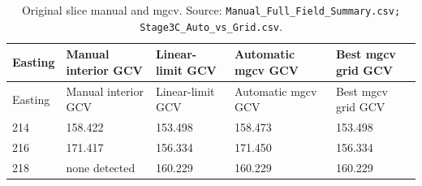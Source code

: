 \begin{longtable}{@{}p{1.4cm}p{3cm}p{2.8cm}p{3.3cm}p{3.2cm}@{}}
\caption{Original slice manual and mgcv. Source: \texttt{Manual\_Full\_Field\_Summary.csv; Stage3C\_Auto\_vs\_Grid.csv}.}\label{tab:original-slice-manual-and-mgcv}\\
\toprule
Easting & Manual interior GCV & Linear-limit GCV & Automatic mgcv GCV & Best mgcv grid GCV\\
\midrule
\endfirsthead
\toprule
Easting & Manual interior GCV & Linear-limit GCV & Automatic mgcv GCV & Best mgcv grid GCV\\
\midrule
\endhead
214 & 158.422 & 153.498 & 158.473 & 153.498\\
216 & 171.417 & 156.334 & 171.450 & 156.334\\
218 & none detected & 160.229 & 160.229 & 160.229\\
\bottomrule
\end{longtable}
